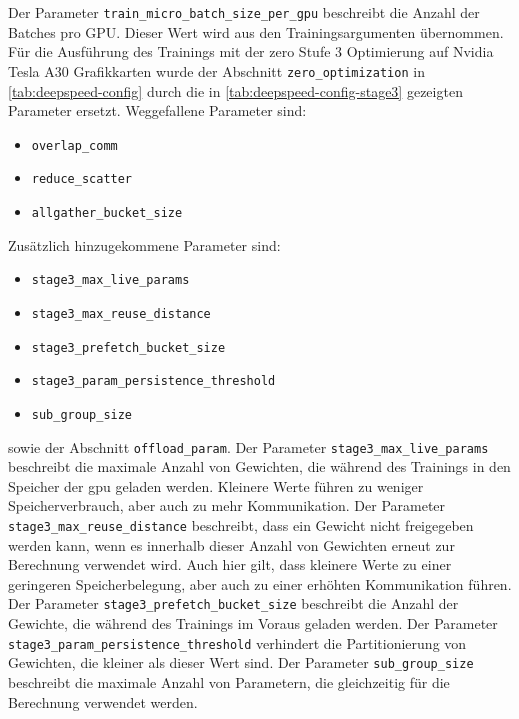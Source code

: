 Der Parameter \texttt{train\_micro\_batch\_size\_per\_gpu} beschreibt die Anzahl der Batches pro GPU.
Dieser Wert wird aus den Trainingsargumenten übernommen.\\

Für die Ausführung des Trainings mit der \ac{zero} Stufe 3 Optimierung auf Nvidia Tesla A30 Grafikkarten wurde der Abschnitt \texttt{zero\_\allowbreak{}optimization} in \cref{tab:deepspeed-config} durch die in \cref{tab:deepspeed-config-stage3} gezeigten Parameter ersetzt.
Weggefallene Parameter sind:
\begin{itemize}
    \item \texttt{overlap\_comm}
    \item \texttt{reduce\_scatter}
    \item \texttt{allgather\_bucket\_size}
\end{itemize}

Zusätzlich hinzugekommene Parameter sind:
\begin{itemize}
    \item \texttt{stage3\_max\_live\_params}
    \item \texttt{stage3\_max\_reuse\_distance}
    \item \texttt{stage3\_prefetch\_bucket\_size}
    \item \texttt{stage3\_param\_persistence\_threshold}
    \item \texttt{sub\_group\_size}
\end{itemize}
sowie der Abschnitt \texttt{offload\_param}.
Der Parameter \texttt{stage3\_max\_live\_\allowbreak{}params} beschreibt die maximale Anzahl von Gewichten, die während des Trainings in den Speicher der \ac{gpu} geladen werden. Kleinere Werte führen zu weniger Speicherverbrauch, aber auch zu mehr Kommunikation.
Der Parameter \texttt{stage3\_max\_reuse\_distance} beschreibt, dass ein Gewicht nicht freigegeben werden kann, wenn es innerhalb dieser Anzahl von Gewichten erneut zur Berechnung verwendet wird. Auch hier gilt, dass kleinere Werte zu einer geringeren Speicherbelegung, aber auch zu einer erhöhten Kommunikation führen.
Der Parameter \texttt{stage3\_prefetch\_bucket\_size} beschreibt die Anzahl der Gewichte, die während des Trainings im Voraus geladen werden.
Der Parameter \texttt{stage3\_param\_persistence\_threshold} verhindert die Partitionierung von Gewichten, die kleiner als dieser Wert sind.
Der Parameter \texttt{sub\_group\_size} beschreibt die maximale Anzahl von Parametern, die gleichzeitig für die Berechnung verwendet werden.

